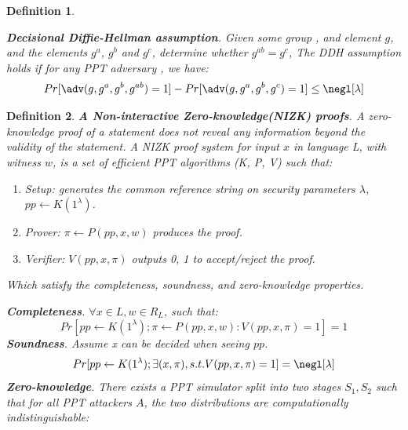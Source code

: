 \documentclass{article}
\newtheorem{myDef}{Definition}
\begin{document}
\begin{myDef}
\label{d:ddh}

\textbf{Decisional Diffie-Hellman assumption}. Given some group \GG, and element $g$, and the elements $g^a$, $g^b$ and $g^{c}$, determine whether $g^{ab} = g^c$, The DDH assumption holds if for any PPT adversary \adv, we have: 
\begin{equation}
    Pr[\adv(g, g^a, g^b, g^{ab}) = 1] - Pr[\adv(g, g^a, g^b, g^c) = 1] \leq \negl[\lambda]
\end{equation}

\end{myDef}

\begin{myDef}
\label{d:zkp}
\textbf{A Non-interactive Zero-knowledge(NIZK) proofs}. A zero-knowledge proof of a statement does not reveal any information beyond the validity of the statement. A NIZK proof system for input $x$ in language L, with witness $w$, is a set of efficient PPT algorithms (K, P, V) such that:
\begin{enumerate}
    \item Setup: generates the common reference string on security parameters $\lambda$, $pp \gets K(1^\lambda)$.
    \item Prover: $\pi \gets P(pp, x, w)$ produces the proof.
    \item Verifier: $V (pp, x, \pi)$ outputs {0, 1} to accept/reject the proof.
\end{enumerate}
Which satisfy the completeness, soundness, and zero-knowledge properties. 

\noindent\textbf{Completeness}. $\forall x \in L, w \in R_L$, such that:
\begin{equation}
    Pr[pp \gets K(1^{\lambda}); \pi \gets P(pp, x, w): V(pp, x, \pi) = 1] = 1
\end{equation}
\noindent\textbf{Soundness}. Assume x can be decided when seeing $pp$.
\begin{equation}
    Pr[pp \gets K(1^{\lambda}); \exists (x,\pi), s.t. V(pp, x, \pi) = 1] = \negl[\lambda]
\end{equation}
\noindent\textbf{Zero-knowledge}. There exists a PPT simulator split into two stages $S_1, S_2$ such that for all PPT attackers $A$, the two distributions are computationally indistinguishable:

\begin{pchstack}
\end{pchstack}


\end{myDef}
\end{document}
